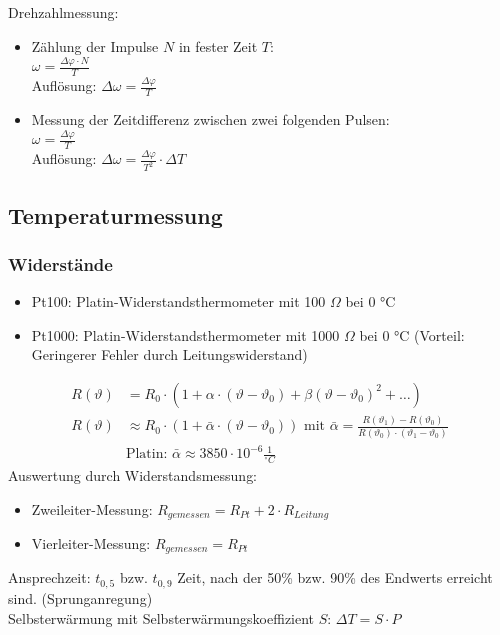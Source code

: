         Drehzahlmessung:
        \begin{itemize}
            \item Zählung der Impulse \(N\) in fester Zeit \(T\): \\
                \(\omega = \frac{\Delta \varphi \cdot N}{T}\) \\ 
                Auflösung: \(\Delta \omega = \frac{\Delta \varphi}{T}\)
            \item Messung der Zeitdifferenz zwischen zwei folgenden Pulsen: \\
                \(\omega = \frac{\Delta \varphi}{T}\) \\
                Auflösung: \(\Delta \omega = \frac{\Delta \varphi}{T^2} \cdot \Delta T\)
        \end{itemize}
    
\subsection{Temperaturmessung}
    \subsubsection{Widerstände}
        \begin{itemize}
            \item Pt100: Platin-Widerstandsthermometer mit 100 \(\Omega\) bei 0 °C
            \item Pt1000: Platin-Widerstandsthermometer mit 1000 \(\Omega\) bei 0 °C (Vorteil: Geringerer Fehler durch Leitungswiderstand)
        \end{itemize}
        \begin{align*}
            R(\vartheta) &= R_0 \cdot (1 + \alpha \cdot (\vartheta - \vartheta_0) + \beta (\vartheta - \vartheta_0)^2 + \ldots) \\
            R(\vartheta) &\approx R_0 \cdot (1 + \bar{\alpha} \cdot (\vartheta - \vartheta_0)) \text{ mit } \bar{\alpha} = \frac{R(\vartheta_1) - R(\vartheta_0)}{R(\vartheta_0) \cdot (\vartheta_1 - \vartheta_0)}\\
            &\text{Platin: } \bar{\alpha} \approx 3850 \cdot 10^{-6} \frac{1}{^\circ C}
        \end{align*}
        Auswertung durch Widerstandsmessung: 
        \begin{itemize}
            \item Zweileiter-Messung: \(R_{gemessen} = R_{Pt} + 2 \cdot R_{Leitung}\)
            \item Vierleiter-Messung: \(R_{gemessen} = R_{Pt}\)
        \end{itemize}
        Ansprechzeit: \(t_{0,5}\) bzw. \(t_{0,9}\) Zeit, nach der 50\% bzw. 90\% des Endwerts erreicht sind. (Sprunganregung)\\
        Selbsterwärmung mit Selbsterwärmungskoeffizient \(S\): \(\Delta T = S \cdot P\)
